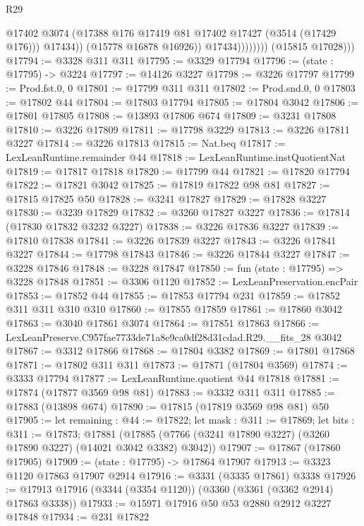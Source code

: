 \begin{lexlean}{R29}
\begin{coremodule}
                              @17402
                              @3074
                              (@17388 @176 @17419 @81 @17402 @17427 (@3514 (@17429 @176)))
                              @17434))
                          (@15778 @16878 @16926))
                        @17434))))))))
        (@15815 @17028)))
@17794 := @3328 @311 @311
@17795 := @3329 @17794
@17796 := (state : @17795) -> @3224
@17797 := @14126 @3227
@17798 := @3226 @17797
@17799 := Prod.fst.{0, 0}
@17801 := @17799 @311 @311
@17802 := Prod.snd.{0, 0}
@17803 := @17802 @44
@17804 := @17803 @17794
@17805 := @17804 @3042
@17806 := @17801 @17805
@17808 := @13893 @17806 @674
@17809 := @3231 @17808
@17810 := @3226 @17809
@17811 := @17798 @3229
@17813 := @3226 @17811 @3227
@17814 := @3226 @17813
@17815 := Nat.beq
@17817 := LexLeanRuntime.remainder @44
@17818 := LexLeanRuntime.instQuotientNat
@17819 := @17817 @17818
@17820 := @17799 @44
@17821 := @17820 @17794
@17822 := @17821 @3042
@17825 := @17819 @17822 @98 @81
@17827 := @17815 @17825 @50
@17828 := @3241 @17827
@17829 := @17828 @3227
@17830 := @3239 @17829
@17832 := @3260 @17827 @3227
@17836 := @17814 (@17830 @17832 @3232 @3227)
@17838 := @3226 @17836 @3227
@17839 := @17810 @17838
@17841 := @3226 @17839 @3227
@17843 := @3226 @17841 @3227
@17844 := @17798 @17843
@17846 := @3226 @17844 @3227
@17847 := @3228 @17846
@17848 := @3228 @17847
@17850 := fun (state : @17795) => @3228 @17848
@17851 := @3306 @1120
@17852 := LexLeanPreservation.encPair
@17853 := @17852 @44
@17855 := @17853 @17794 @231
@17859 := @17852 @311 @311 @310 @310
@17860 := @17855 @17859
@17861 := @17860 @3042
@17863 := @3040 @17861 @3074
@17864 := @17851 @17863
@17866 := LexLeanPreserve.C957fae7733de71a8e9ca0df28d31cdad.R29.__fits_28 @3042
@17867 := @3312 @17866
@17868 := @17804 @3382
@17869 := @17801 @17868
@17871 := @17802 @311 @311
@17873 := @17871 (@17804 @3569)
@17874 := @3333 @17794
@17877 := LexLeanRuntime.quotient @44 @17818
@17881 := @17874 (@17877 @3569 @98 @81)
@17883 := @3332 @311 @311
@17885 := @17883 (@13898 @674)
@17890 := @17815 (@17819 @3569 @98 @81) @50
@17905 := let remaining : @44 := @17822;
  let mask : @311 := @17869;
  let bits : @311 := @17873;
  @17881 (@17885 (@7766 (@3241 @17890 @3227) (@3260 @17890 @3227) (@14021 @3042 @3382) @3042))
@17907 := @17867 (@17860 @17905)
@17909 := (state : @17795) -> @17864 @17907
@17913 := @3323 @1120 @17863 @17907 @2914
@17916 := @3331 (@3335 @17861) @3338
@17926 := @17913 @17916 (@3344 (@3354 @1120)) (@3360 (@3361 (@3362 @2914) @17863 @3338))
@17933 := @15971 @17916 @50 @53 @2880 @2912 @3227 @17848
@17934 := @231 @17822

\end{coremodule}
\end{lexlean}
